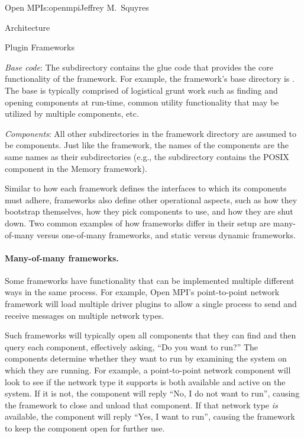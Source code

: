\begin{aosachapter}{Open MPI}{s:openmpi}{Jeffrey M.\ Squyres}
\begin{aosasect1}{Architecture}
\begin{aosasect2}{Plugin Frameworks}
\begin{aosaenumerate}
\item \emph{Base code}: The  subdirectory contains the glue
  code that provides the core functionality of the framework.  For
  example, the  framework's base directory is .  
  The base is typically comprised of logistical grunt
  work such as finding and opening components at run-time, common
  utility functionality that may be utilized by multiple components,
  etc.

\item \emph{Components}: All other subdirectories in the framework
  directory are assumed to be components.  Just like the framework,
  the names of the components are the same names as their
  subdirectories (e.g., the  subdirectory contains
  the POSIX component in the Memory framework).
\end{aosaenumerate}

Similar to how each framework defines the interfaces to which its
components must adhere, frameworks also define other operational
aspects, such as how they bootstrap themselves, how they pick
components to use, and how they are shut down.  Two common examples of
how frameworks differ in their setup are many-of-many versus one-of-many
frameworks, and static versus dynamic frameworks.


\paragraph{Many-of-many frameworks.} 

Some frameworks have functionality that can be implemented multiple
different ways in the same process.
%
For example, Open MPI's point-to-point network framework will load
multiple driver plugins to allow a single process to send and receive
messages on multiple network types.

Such frameworks will typically open all components that they can find
and then query each component, effectively asking, ``Do you want to
run?''  
%
The components determine whether they want to run by examining the
system on which they are running.
%
For example, a point-to-point network component will look to see if
the network type it supports is both available and active on the
system.
%
If it is not, the component will reply ``No, I do not want to run'',
causing the framework to close and unload that component.
% 
If that network type \emph{is} available, the component will reply
``Yes, I want to run'', causing the framework to keep the component
open for further use.


\end{aosasect2}
\end{aosasect1}
\end{aosachapter}
